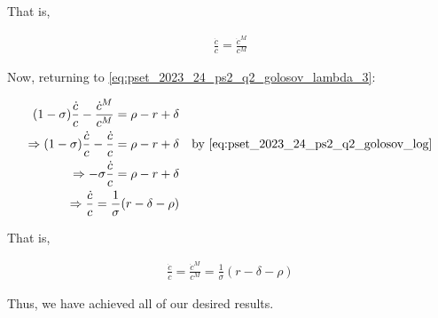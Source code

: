 That is,

\begin{align}
    \frac{\dot{c}}{c} = \frac{\dot{c}^M}{c^M} \label{eq:pset_2023_24_ps2_q2_golosov_log}
\end{align}

Now, returning to \eqref{eq:pset_2023_24_ps2_q2_golosov_lambda_3}:

\begin{align}
    (1-\sigma) \frac{\dot{c}}{c}-\frac{\dot{c}^M}{c^M} = \rho - r +\delta \\
    \Rightarrow (1-\sigma) \frac{\dot{c}}{c}-\frac{\dot{c}}{c} = \rho - r +\delta && \text{by \eqref{eq:pset_2023_24_ps2_q2_golosov_log}} \\
    \Rightarrow -\sigma \frac{\dot{c}}{c} = \rho - r +\delta \\
    \Rightarrow \frac{\dot{c}}{c} = \frac{1}{\sigma}(r-\delta-\rho)
\end{align}

That is,

\begin{align}
    \frac{\dot{c}}{c} = \frac{\dot{c}^M}{c^M} = \frac{1}{\sigma}(r-\delta-\rho)
\end{align}

Thus, we have achieved all of our desired results.


